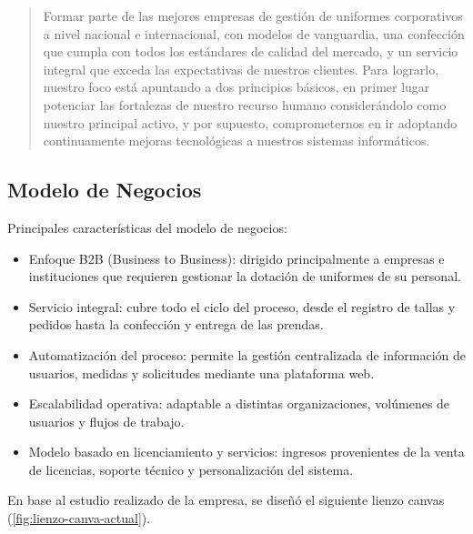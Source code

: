 \begin{quote}
    Formar parte de las mejores empresas de gestión de uniformes corporativos a nivel nacional e internacional, con modelos de vanguardia, una confección que cumpla con todos los estándares de calidad del mercado, y un servicio integral que exceda las expectativas de nuestros clientes. Para lograrlo, nuestro foco está apuntando a dos principios básicos, en primer lugar potenciar las fortalezas de nuestro recurso humano considerándolo como nuestro principal activo, y por supuesto, comprometernos en ir adoptando continuamente mejoras tecnológicas a nuestros sistemas informáticos.
\end{quote}

\subsection{Modelo de Negocios}


Principales características del modelo de negocios:

\begin{itemize}
    \item Enfoque B2B (Business to Business): dirigido principalmente a empresas e instituciones que requieren gestionar la dotación de uniformes de su personal.
    \item Servicio integral: cubre todo el ciclo del proceso, desde el registro de tallas y pedidos hasta la confección y entrega de las prendas.
    \item Automatización del proceso: permite la gestión centralizada de información de usuarios, medidas y solicitudes mediante una plataforma web.
    \item Escalabilidad operativa: adaptable a distintas organizaciones, volúmenes de usuarios y flujos de trabajo.
    \item Modelo basado en licenciamiento y servicios: ingresos provenientes de la venta de licencias, soporte técnico y personalización del sistema.
\end{itemize}

En base al estudio realizado de la empresa, se diseñó el siguiente lienzo canvas (\autoref{fig:lienzo-canva-actual}).

